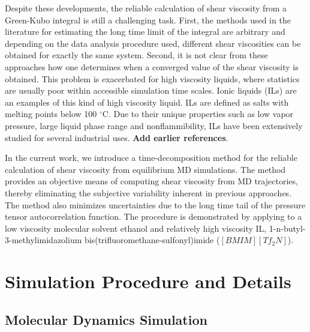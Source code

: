 \documentclass[12pt]{article}
\begin{document}
Despite these developments, the reliable calculation of shear viscosity from a Green-Kubo integral is still a challenging task. First, the methods used in the literature for estimating the long time limit of the integral are arbitrary and depending on the data analysis procedure used, different shear viscosities can be obtained for exactly the same system. Second, it is not clear from these approaches how one determines when a converged value of the shear viscosity is obtained. This problem is exacerbated for high viscosity liquids, where statistics are usually poor within accessible simulation time scales. Ionic liquids (ILs) are an examples of this kind of high viscosity liquid. ILs are defined as salts with melting points below 100 $^\circ$C.
Due to their unique properties such as low vapor pressure, large liquid phase range and nonflammibility,
ILs have been extensively studied for several industrial uses. {\bf Add earlier references}. 

In the current work, we introduce a time-decomposition method for the reliable calculation of shear viscosity 
from equilibrium MD simulations. The method provides an objective means of computing shear viscosity from MD trajectories, thereby eliminating the subjective variability inherent in previous approaches. The method also minimizes uncertainties due to the long time tail of the pressure tensor autocorrelation function.
The procedure is demonstrated by applying to a low viscosity molecular solvent ethanol and relatively high viscosity IL, 
1-n-butyl-3-methylimidazolium bis(trifluoromethane-sulfonyl)imide ($[BMIM][Tf_2N]$).

\section{Simulation Procedure and Details}

\subsection{Molecular Dynamics Simulation}
\end{document}
